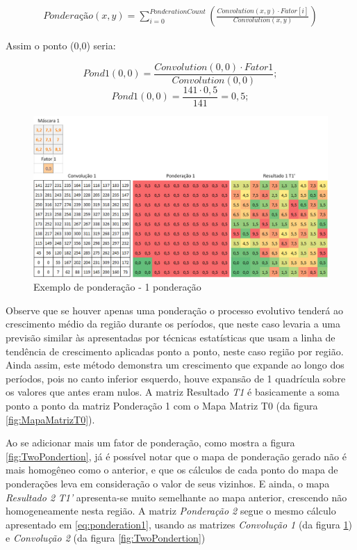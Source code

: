 \begin{equation}
\label{eq:ponderation1}
\begin{split}
Ponderação(x,y) = \sum_{i=0}^{PonderationCount} \left(\frac{Convolution(x,y) \cdot Fator[i]}{Convolution(x,y)}\right)
\end{split}
\end{equation}

Assim o ponto (0,0) seria:

\[Pond1(0,0) = \frac{Convolution(0,0) \cdot Fator1}{ Convolution(0,0)};\]
\[Pond1(0,0) = \frac{141 \cdot 0,5}{ 141 } = 0,5;\]


\begin{figure}[h]
	\centering	\includegraphics[scale=0.6]{Figuras/PonderationsExample-1Ponderation.png}
	\caption{Exemplo de ponderação - 1 ponderação}
	\label{fig:OnePondertion}
\end{figure}

Observe que se houver apenas uma ponderação o processo evolutivo tenderá ao crescimento médio da região durante os períodos, que neste caso levaria a uma previsão similar às apresentadas por técnicas estatísticas que usam a linha de tendência de crescimento aplicadas ponto a ponto, neste caso região por região. Ainda assim, este método demonstra um crescimento que expande ao longo dos períodos, pois no canto inferior esquerdo, houve expansão de 1 quadrícula sobre os valores que antes eram nulos. A matriz Resultado \emph{T1} é basicamente a soma ponto a ponto da matriz Ponderação 1 com o Mapa Matriz T0 (da figura \ref{fig:MapaMatrizT0}).

Ao se adicionar mais um fator de ponderação, como mostra a figura \ref{fig:TwoPondertion}, já é possível notar que o mapa de ponderação gerado não é mais homogêneo como o anterior, e que os cálculos de cada ponto do mapa de ponderações leva em consideração o valor de seus vizinhos. E ainda, o mapa \emph{Resultado 2} \emph{T1’} apresenta-se muito semelhante ao mapa anterior, crescendo não homogeneamente nesta região. A matriz \emph{Ponderação 2} segue o mesmo cálculo apresentado em \ref{eq:ponderation1}, usando as matrizes \emph{Convolução 1} (da figura \ref{fig:OnePondertion}) e \emph{Convolução 2} (da figura \ref{fig:TwoPondertion})

